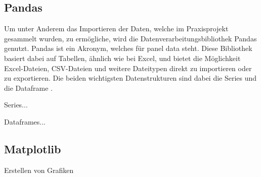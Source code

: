 \subsection{Pandas}

Um unter Anderem das Importieren der Daten, welche im Praxisprojekt gesammelt wurden, zu ermögliche, wird die Datenverarbeitungsbibliothek Pandas genutzt.
Pandas ist ein Akronym, welches für panel data steht. Diese Bibliothek basiert dabei auf Tabellen, ähnlich wie bei Excel, und bietet die Möglichkeit
Excel-Dateien, CSV-Dateien und weitere Dateitypen direkt zu importieren oder zu exportieren. Die beiden wichtigsten Datenstrukturen sind dabei die
Series und die Dataframe \cite[vgl. S.3]{Pandas}. 

Series... 

Dataframes... 

\subsection{Matplotlib}
Erstellen von Grafiken
